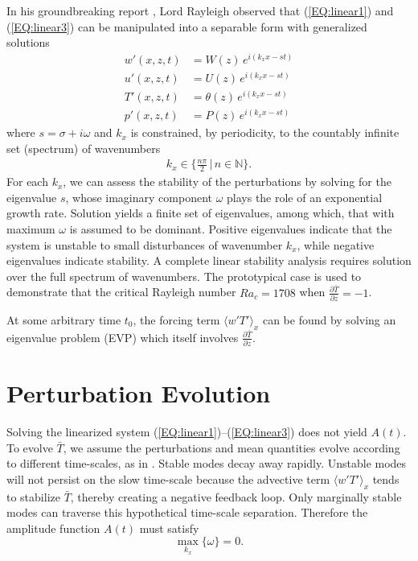 \documentclass[reprint,amsmath,amssymb,aps]{revtex4-1}
\begin{document}
In his groundbreaking report \cite{Rayleigh_1916}, Lord Rayleigh observed that (\ref{EQ:linear1}) and (\ref{EQ:linear3}) can be manipulated into a separable form with generalized solutions
\begin{align}
    w'(x, z, t) &= W(z) \, e^{i(k_xx-st)} \label{EQ:normal_modes1}\\ 
    u'(x, z, t) &= U(z) \, e^{i(k_xx-st)} \label{EQ:normal_modes2}\\ 
    T'(x, z, t) &= \theta(z) \, e^{i(k_xx-st)} \label{EQ:normal_modes3}\\ 
    p'(x, z, t) &= P(z) \, e^{i(k_xx-st)}\label{EQ:normal_modes4}
\end{align}
where $s = \sigma + i\omega$ and $k_x$ is constrained, by periodicity, to the countably infinite set (spectrum) of wavenumbers
\begin{align}
    k_x \in \big\{\frac{n\pi}{2} \, \big| \, n \in \mathbb{N}\big\}.
\end{align}
For each $k_x$, we can assess the stability of the perturbations by solving for the eigenvalue $s$, whose imaginary component $\omega$ plays the role of an exponential growth rate. 
Solution yields a finite set of eigenvalues, among which, that with maximum $\omega$ is assumed to be dominant. 
Positive eigenvalues indicate that the system is unstable to small disturbances of wavenumber $k_x$, while negative eigenvalues indicate stability. 
A complete linear stability analysis requires solution over the full spectrum of wavenumbers. 
The prototypical case is used to demonstrate that the critical Rayleigh number $Ra_c = 1708$ when $\frac{\partial \bar{T}}{\partial z} = -1$.
 
At some arbitrary time $t_0$, the forcing term $\langle w'T' \rangle_x$ can be found by solving an eigenvalue problem (EVP) which itself involves $\frac{\partial \bar{T}}{\partial z}$. 

\section{Perturbation Evolution}
Solving the linearized system (\ref{EQ:linear1})--(\ref{EQ:linear3}) does not yield $A(t)$. 
To evolve $\bar{T}$, we assume the perturbations and mean quantities evolve according to different time-scales, as in \cite{michel_chini_2019}.
Stable modes decay away rapidly. 
Unstable modes will not persist on the slow time-scale because the advective term $\langle w'T' \rangle_x$ tends to stabilize $\bar{T}$, thereby creating a negative feedback loop. Only marginally stable modes can traverse this hypothetical time-scale separation. Therefore the amplitude function $A(t)$ must satisfy
\begin{equation}
    \max_{k_x} \{ \omega \} = 0.
\end{equation}
\end{document}
